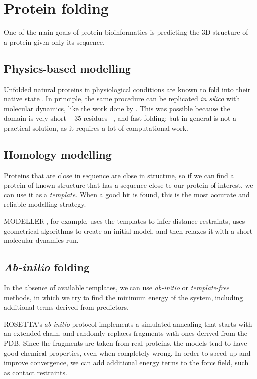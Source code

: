 
\section{Protein folding}

One of the main goals of protein bioinformatics is predicting the 3D structure of a protein given only its sequence.

\subsection{Physics-based modelling}
Unfolded natural proteins in physiological conditions are known to fold into their native state \citep{fold_graciously}.
In principle, the same procedure can be replicated \emph{in silico} with molecular dynamics, like the work done by \citet{physics_folding}.
This was possible because the domain is very short -- 35 residues --, and fast folding; but in general is not a practical solution, as it requires a lot of computational work.

\subsection{Homology modelling}
Proteins that are close in sequence are close in structure, so if we can find a protein of known structure that has a sequence close to our protein of interest, we can use it as a \emph{template}.
When a good hit is found, this is the most accurate and reliable modelling strategy.

MODELLER \citep{modeller}, for example, uses the templates to infer distance restraints, uses geometrical algorithms to create an initial model, and then relaxes it with a short molecular dynamics run.


\subsection{\emph{Ab-initio} folding}
In the absence of available templates, we can use \emph{ab-initio} or \emph{template-free} methods, in which we try to find the minimum energy of the system, including additional terms derived from predictors.

ROSETTA's \citep{Rosetta3}  \emph{ab initio} protocol implements a simulated annealing that starts with an extended chain, and randomly replaces fragments with ones derived from the PDB.
Since the fragments are taken from real proteins, the models tend to have good chemical properties, even when completely wrong.
In order to speed up and improve convergence, we can add additional energy terms to the force field, such as contact restraints.

